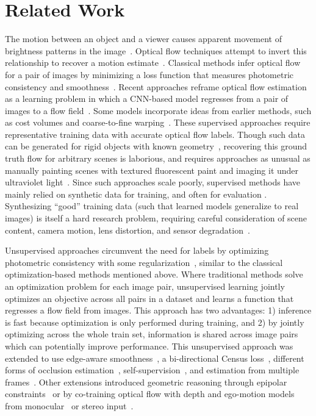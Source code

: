 \documentclass[runningheads]{llncs}
\begin{document}
\section{Related Work}

The motion between an object and a viewer causes apparent movement of brightness patterns in the image~\cite{Gibson1950}. Optical flow techniques attempt to invert this relationship to recover a motion estimate~\cite{lucas1981iterative}. Classical methods infer optical flow for a pair of images by minimizing a loss function that measures photometric consistency and smoothness~\cite{Horn1981,Brox04,Sun2010}. Recent approaches reframe optical flow estimation as a learning problem in which a CNN-based model regresses from a pair of images to a flow field~\cite{FlowNet,Flownet2}. Some models incorporate ideas from earlier methods, such as cost volumes and coarse-to-fine warping~\cite{spynet2017,Sun2018PWCNet,yang2019volumetric}. These supervised approaches require representative training data with accurate optical flow labels. Though such data can be generated for rigid objects with known geometry~\cite{Geiger2012CVPR,KITTI2015}, recovering this ground truth flow for arbitrary scenes is laborious, and requires approaches as unusual as manually painting scenes with textured fluorescent paint and imaging it under ultraviolet light~\cite{Baker2011}. Since such approaches scale poorly, supervised methods have mainly relied on synthetic data for training, and often for evaluation \cite{Barron94performanceof,ButlerECCV2012,FlowNet}. Synthesizing ``good'' training data (such that learned models generalize to real images) is itself a hard research problem, requiring careful consideration of scene content, camera motion, lens distortion, and sensor degradation~\cite{Mayer2018}.

Unsupervised approaches circumvent the need for labels by optimizing photometric consistency with some regularization~\cite{ren2017unsupervised,jjyu2016unsupflow}, similar to the classical optimization-based methods mentioned above. Where traditional methods solve an optimization problem for each image pair, unsupervised learning jointly optimizes an objective across all pairs in a dataset and learns a function that regresses a flow field from images. This approach has two advantages: 1) inference is fast because optimization is only performed during training, and 2) by jointly optimizing across the whole train set, information is shared across image pairs which can potentially improve performance. This unsupervised approach was extended to use edge-aware smoothness~\cite{wang2018occlusion}, a bi-directional Census loss~\cite{meister2018unflow}, different forms of occlusion estimation~\cite{Janai2018ECCV,meister2018unflow,wang2018occlusion}, self-supervision~\cite{DDFlow,SelFlow}, and estimation from multiple frames~\cite{Janai2018ECCV,SelFlow}. Other extensions introduced geometric reasoning through epipolar constraints~\cite{Zhong2019UnsupervisedDE} or by co-training optical flow with depth and ego-motion models from monocular~\cite{ranjan2019cvpr,yin2018geonet,zou2018dfnet} or stereo input~\cite{wang2018unos}.
\end{document}
